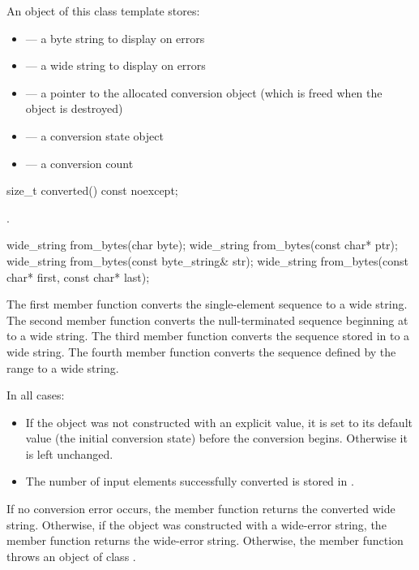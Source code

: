 \pnum
An object of this class template stores:

\begin{itemize}
\item {} --- a byte string to display on errors
\item {} --- a wide string to display on errors
\item {} --- a pointer to the allocated conversion object
(which is freed when the  object is destroyed)
\item {} --- a conversion state object
\item {} --- a conversion count
\end{itemize}

%
\begin{itemdecl}
size_t converted() const noexcept;
\end{itemdecl}

\begin{itemdescr}
\pnum
\returns
{}.
\end{itemdescr}

%
\begin{itemdecl}
wide_string from_bytes(char byte);
wide_string from_bytes(const char* ptr);
wide_string from_bytes(const byte_string& str);
wide_string from_bytes(const char* first, const char* last);
\end{itemdecl}

\begin{itemdescr}
\pnum
\effects
The first member function converts the single-element sequence  to a
wide string. The second member function converts the null-terminated
sequence beginning at  to a wide string. The third member function
converts the sequence stored in  to a wide string. The fourth member
function converts the sequence defined by the range  to a
wide string.

\pnum
In all cases:

\begin{itemize}
\item If the  object was not constructed with an explicit value, it
is set to its default value (the initial conversion state) before the
conversion begins. Otherwise it is left unchanged.

\item The number of input elements successfully converted is stored in .
\end{itemize}

\pnum
\returns
If no conversion error occurs, the member function returns the converted wide string.
Otherwise, if the object was constructed with a wide-error string, the
member function returns the wide-error string.
Otherwise, the member function throws an object of class .
\end{itemdescr}

